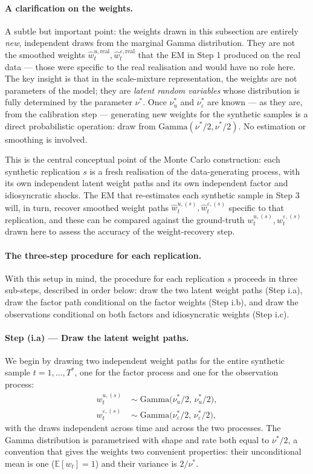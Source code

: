\documentclass[11pt, a4paper, oneside]{article}
\begin{document}
\paragraph{A clarification on the weights.}
A subtle but important point: the weights drawn in this subsection
are entirely \emph{new}, independent draws from the marginal Gamma
distribution. They are not the smoothed weights
$\hat{w}_t^{u, \mathrm{real}}, \hat{w}_t^{\varepsilon, \mathrm{real}}$
that the EM in Step 1 produced on the real data — those were
specific to the real realisation and would have no role here. The
key insight is that in the scale-mixture representation, the
weights are not parameters of the model; they are \emph{latent
random variables} whose distribution is fully determined by the
parameter $\nu^*$. Once $\nu_u^*$ and $\nu_\varepsilon^*$ are
known — as they are, from the calibration step — generating new
weights for the synthetic samples is a direct probabilistic
operation: draw from $\mathrm{Gamma}(\nu^*/2, \nu^*/2)$. No
estimation or smoothing is involved.

This is the central conceptual point of the Monte Carlo
construction: each synthetic replication $s$ is a fresh
realisation of the data-generating process, with its own
independent latent weight paths and its own independent factor
and idiosyncratic shocks. The EM that re-estimates each
synthetic sample in Step 3 will, in turn, recover smoothed weight
paths $\hat{w}_t^{u, (s)}, \hat{w}_t^{\varepsilon, (s)}$ specific
to that replication, and these can be compared against the
ground-truth $w_t^{u, (s)}, w_t^{\varepsilon, (s)}$ drawn here to
assess the accuracy of the weight-recovery step.

\paragraph{The three-step procedure for each replication.}
With this setup in mind, the procedure for each replication $s$
proceeds in three sub-steps, described in order below: draw the
two latent weight paths (Step i.a), draw the factor path
conditional on the factor weights (Step i.b), and draw the
observations conditional on both factors and idiosyncratic weights
(Step i.c).

\paragraph{Step (i.a) — Draw the latent weight paths.}
We begin by drawing two independent weight paths for the entire
synthetic sample $t = 1, \ldots, T^*$, one for the factor process
and one for the observation process:
\begin{align}
w_t^{u, (s)} \;&\sim\; \mathrm{Gamma}\!\big(\nu_u^*/2,\, \nu_u^*/2\big), \\[2pt]
w_t^{\varepsilon, (s)} \;&\sim\; \mathrm{Gamma}\!\big(\nu_\varepsilon^*/2,\, \nu_\varepsilon^*/2\big),
\end{align}
with the draws independent across time and across the two
processes. The Gamma distribution is parametrised with shape and
rate both equal to $\nu^*/2$, a convention that gives the weights
two convenient properties: their unconditional mean is one
($\mathbb{E}[w_t] = 1$) and their variance is $2/\nu^*$.
\end{document}
